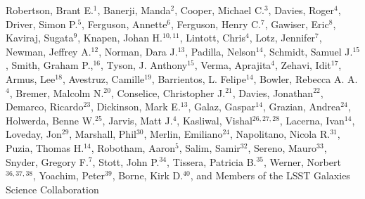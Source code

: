 Robertson, Brant E.$^{1}$, 
Banerji, Manda$^{2}$,
Cooper, Michael C.$^{3}$,
Davies, Roger$^{4}$,
Driver, Simon P.$^{5}$,
Ferguson, Annette$^{6}$,
Ferguson, Henry C.$^{7}$,
Gawiser, Eric$^{8}$,
Kaviraj, Sugata$^{9}$,
Knapen, Johan H.$^{10,11}$,
Lintott, Chris$^{4}$,
Lotz, Jennifer$^{7}$,
Newman, Jeffrey A.$^{12}$,
Norman, Dara J.$^{13}$,
Padilla, Nelson$^{14}$,
Schmidt, Samuel J.$^{15}$,
Smith, Graham P.,$^{16}$,
Tyson, J. Anthony$^{15}$,
Verma, Aprajita$^{4}$,
Zehavi, Idit$^{17}$,
Armus, Lee$^{18}$,
Avestruz, Camille$^{19}$,
Barrientos, L. Felipe$^{14}$,
Bowler, Rebecca A. A.$^{4}$,
Bremer, Malcolm N.$^{20}$,
Conselice, Christopher J.$^{21}$,
Davies, Jonathan$^{22}$,
Demarco, Ricardo$^{23}$,
Dickinson, Mark E.$^{13}$,
Galaz, Gaspar$^{14}$,
Grazian, Andrea$^{24}$,
Holwerda, Benne W.$^{25}$,
Jarvis, Matt J.$^{4}$,
Kasliwal, Vishal$^{26,27,28}$,
Lacerna, Ivan$^{14}$,
Loveday, Jon$^{29}$,
Marshall, Phil$^{30}$,
Merlin, Emiliano$^{24}$,
Napolitano, Nicola R.$^{31}$,
Puzia, Thomas H.$^{14}$,
Robotham, Aaron$^{5}$,
Salim, Samir$^{32}$,
Sereno, Mauro$^{33}$,
Snyder, Gregory F.$^{7}$,
Stott, John P.$^{34}$,
Tissera, Patricia B.$^{35}$,
Werner, Norbert$^{36,37,38}$,
Yoachim, Peter$^{39}$,
Borne, Kirk D.$^{40}$,
and Members of the LSST Galaxies Science Collaboration 

\vspace*{5mm}


